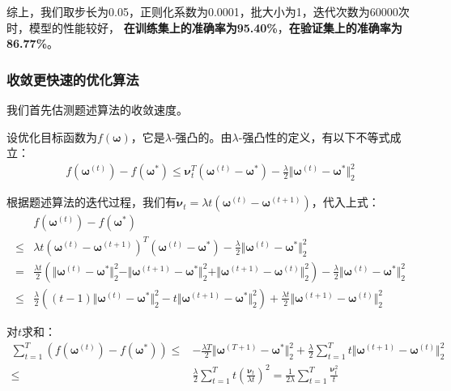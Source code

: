 \documentclass[12pt, a4paper]{article}
\newcommand{\ivec}{\bm}
\newcommand{\omegav}{\ivec{\omega}}
\begin{document}
        综上，我们取步长为0.05，正则化系数为0.0001，批大小为1，迭代次数为60000次时，模型的性能较好，
        \textbf{在训练集上的准确率为95.40\%}，\textbf{在验证集上的准确率为86.77\%}。

    \subsubsection{收敛更快速的优化算法}

        我们首先估测题述算法的收敛速度。

        设优化目标函数为$f(\omegav)$，它是$\lambda$-强凸的。由$\lambda$-强凸性的定义，有以下不等式成立：
        \begin{align*}
        f(\omegav^{(t)}) - f(\omegav^*) \le \ivec{\nu}_t^T (\omegav^{(t)} - \omegav^*) - \frac{\lambda}{2} \Vert \omegav^{(t)} - \omegav^* \Vert_2^2
        \end{align*}

        根据题述算法的迭代过程，我们有$\ivec{\nu}_t = \lambda t (\omegav^{(t)} - \omegav^{(t + 1)})$，代入上式：
        \begin{align*}
        &f(\omegav^{(t)}) - f(\omegav^*) \\
        \le& \lambda t (\omegav^{(t)} - \omegav^{(t + 1)})^T (\omegav^{(t)} - \omegav^*) - \frac{\lambda}{2} \Vert \omegav^{(t)} - \omegav^* \Vert_2^2 \\
        =  & \frac{\lambda t}{2} (\Vert \omegav^{(t)} - \omegav^* \Vert_2^2 - \Vert \omegav^{(t + 1)} - \omegav^* \Vert_2^2 + \Vert \omegav^{(t + 1)} - \omegav^{(t)} \Vert_2^2) - \frac{\lambda}{2} \Vert \omegav^{(t)} - \omegav^* \Vert_2^2\\
        \le& \frac{\lambda }{2} ((t - 1) \Vert \omegav^{(t)} -  \omegav^* \Vert_2^2 - t \Vert \omegav^{(t + 1)} - \omegav^* \Vert_2^2) + \frac{\lambda t}{2} \Vert \omegav^{(t + 1)} - \omegav^{(t)} \Vert_2^2
        \end{align*}

        对$t$求和：
        \begin{align*}
        \sum_{t = 1}^{T} (f(\omegav^{(t)}) - f(\omegav^*))
        \le& - \frac{\lambda T}{2} \Vert \omegav^{(T + 1)} - \omegav^* \Vert_2^2 + \frac{\lambda}{2} \sum_{t = 1}^{T} t \Vert \omegav^{(t + 1)} - \omegav^{(t)} \Vert_2^2 \\
        \le& \frac{\lambda}{2} \sum_{t = 1}^{T} t (\frac{\ivec{\nu}_t}{\lambda t})^2 = \frac{1}{2 \lambda} \sum_{t = 1}^{T} \frac{\ivec{\nu}_t^2}{t}
        \end{align*}
\end{document}
